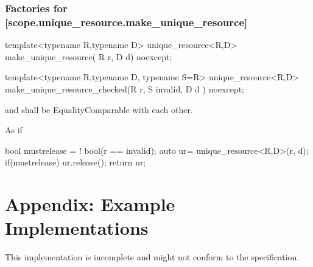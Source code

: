 \documentclass[ebook,11pt,article]{memoir}
\begin{document}
\subsection {Factories for  [scope.unique_resource.make_unique_resource]}
\begin{itemdecl}
template<typename R,typename D>
unique_resource<R,D>
make_unique_resource( R r, D d) noexcept;
\end{itemdecl}

\pnum
\returns {}

\begin{itemdecl}
template<typename R,typename D, typename S=R>
unique_resource<R,D>
make_unique_resource_checked(R r, S invalid, D d ) noexcept;
\end{itemdecl}

\pnum
\requires {} and  shall be EqualityComparable with each other.

\pnum
\effects As if
\begin{codeblock}
  bool mustrelease = ! bool(r == invalid);
  auto ur= unique_resource<R,D>(r, d);
  if(mustrelease) ur.release();
  return ur;
\end{codeblock}

\newpage
\chapter{Appendix: Example Implementations}
This implementation is incomplete and might not conform to the specification.
\end{document}
